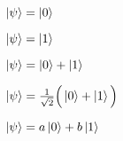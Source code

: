 \documentclass{article}
\begin{document}
$\ket{\psi} = \ket{0}$
\newline

$\ket{\psi} = \ket{1}$
\newline

$\ket{\psi} = \ket{0} + \ket{1}$
\newline

$\ket{\psi} = \frac{1}{\sqrt{2}} \Big( \ket{0} + \ket{1} \Big)$
\newline 

$\ket{\psi} = a\ket{0} + b\ket{1}$
\end{document}
